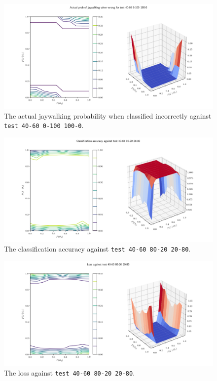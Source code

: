 \documentclass[]{report}
\newcommand{\code}{\texttt}
\begin{document}
\begin{figure}[h]
    \centering
    \centerline{\includegraphics[scale=0.55]{test_40-60_0-100_100-0_jay_prob.png}}
    \caption[]{The actual jaywalking probability when classified incorrectly against \code{test 40-60 0-100 100-0}.}
    \label{fig:test_40-60_0-100_100-0_jay_prob_plot}
\end{figure}

% 
% 

\begin{figure}[h]
    \centering
    \centerline{\includegraphics[scale=0.55]{test_40-60_80-20_20-80_accuracy.png}}
    \caption[]{The classification accuracy against \code{test 40-60 80-20 20-80}.}
    \label{fig:test_40-60_80-20_20-80_accuracy_plot}
\end{figure}

\begin{figure}[h]
    \centering
    \centerline{\includegraphics[scale=0.55]{test_40-60_80-20_20-80_loss.png}}
    \caption[]{The loss against \code{test 40-60 80-20 20-80}.}
    \label{fig:test_40-60_80-20_20-80_loss_plot}
\end{figure}
\end{document}
